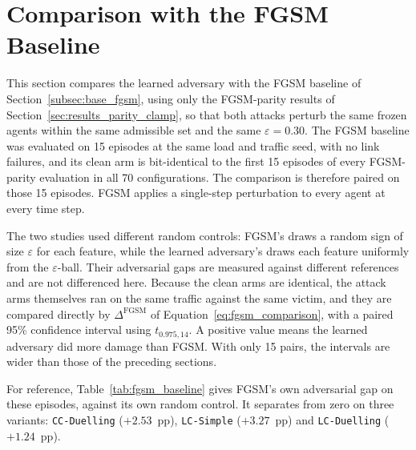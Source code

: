 \section{Comparison with the FGSM Baseline}
\label{sec:results_fgsm_comparison}

This section compares the learned adversary with the FGSM baseline of
Section~\ref{subsec:base_fgsm}, using only the FGSM-parity results of
Section~\ref{sec:results_parity_clamp}, so that both attacks perturb the same frozen
agents within the same admissible set and the same $\varepsilon = 0.30$. The FGSM
baseline was evaluated on 15 episodes at the same load and traffic seed, with no link
failures, and its clean arm is bit-identical to the first 15 episodes of every
FGSM-parity evaluation in all 70 configurations. The comparison is therefore paired on
those 15 episodes. FGSM applies a single-step perturbation to every agent at every
time step.

The two studies used different random controls: FGSM's draws a random sign of size
$\varepsilon$ for each feature, while the learned adversary's draws each feature
uniformly from the $\varepsilon$-ball. Their adversarial gaps are measured against
different references and are not differenced here. Because the clean arms are
identical, the attack arms themselves ran on the same traffic against the same victim,
and they are compared directly by $\Delta^{\text{FGSM}}$ of
Equation~\eqref{eq:fgsm_comparison}, with a paired 95\% confidence interval using
$t_{0.975,14}$. A positive value means the learned adversary did more damage than FGSM.
With only 15 pairs, the intervals are wider than those of the preceding sections.

For reference, Table~\ref{tab:fgsm_baseline} gives FGSM's own adversarial gap on these
episodes, against its own random control. It separates from zero on three variants:
\texttt{CC-Duelling} ($+2.53$~pp), \texttt{LC-Simple} ($+3.27$~pp) and
\texttt{LC-Duelling} ($+1.24$~pp).


